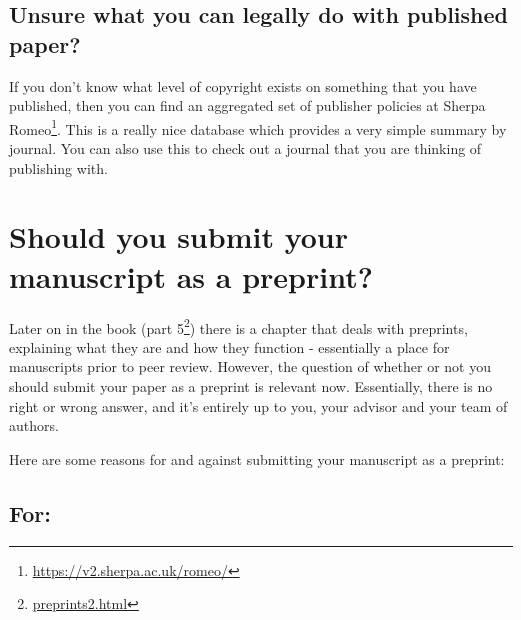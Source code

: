 \documentclass[
]{krantz}
\renewcommand{\href}[2]{#2\footnote{\url{#1}}}
\begin{document}
\hypertarget{unsure-what-you-can-legally-do-with-published-paper}{%
\section{Unsure what you can legally do with published paper?}\label{unsure-what-you-can-legally-do-with-published-paper}}

If you don't know what level of copyright exists on something that you have published, then you can find an aggregated set of publisher policies at \href{https://v2.sherpa.ac.uk/romeo/}{Sherpa Romeo}. This is a really nice database which provides a very simple summary by journal. You can also use this to check out a journal that you are thinking of publishing with.

\hypertarget{preprint.html}{%
\chapter{Should you submit your manuscript as a preprint?}\label{preprint.html}}

Later on in the book (\href{preprints2.html}{part 5}) there is a chapter that deals with preprints, explaining what they are and how they function - essentially a place for manuscripts prior to peer review. However, the question of whether or not you should submit your paper as a preprint is relevant now. Essentially, there is no right or wrong answer, and it's entirely up to you, your advisor and your team of authors.

Here are some reasons for and against submitting your manuscript as a preprint:

\hypertarget{for}{%
\section{For:}\label{for}}
\end{document}
